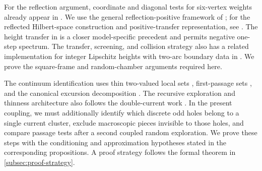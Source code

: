 For the reflection argument, coordinate and diagonal tests for
six-vertex weights already appear in
\cite[Section~6]{FrohlichIsraelLiebSimon1980}. We use the general
reflection-positive framework of \cite{FrohlichIsraelLiebSimon1978};
for the reflected Hilbert-space construction and positive-transfer
representation, see \cite[Sections~3.1--3.3 and~4.1]{Usui2012}.
The height transfer in \cite[Section~4.5.3]{DKLM2026} is a closer
model-specific precedent and permits negative one-step spectrum.
The transfer, screening, and collision strategy also has a related
implementation for integer Lipschitz heights with two-arc boundary data
in \cite[Sections~5, 7, and~9--10]{Triangular}. We prove the square-frame
and random-chamber arguments required here.

The continuum identification uses thin two-valued local sets
\cite{ASW2017,AS2018}, first-passage sets \cite{ALS2017,ALS2018}, and
the canonical excursion decomposition \cite{ALS2023}. The recursive
exploration and thinness architecture also follows the double-current
work \cite{DRC2025}. In the present coupling, we must additionally
identify which discrete odd holes belong to a single current cluster,
exclude macroscopic pieces invisible to those holes, and compare passage
tests after a second coupled random exploration. We prove these steps
with the conditioning and approximation hypotheses stated in the
corresponding propositions. A proof strategy follows the formal theorem
in \cref{subsec:proof-strategy}.
